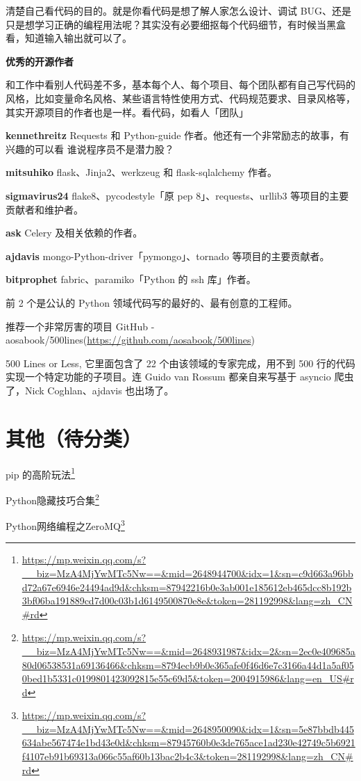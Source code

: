 \documentclass[]{ctexbook}
\renewcommand{\href}[2]{#2\footnote{\url{#1}}}
\begin{document}
清楚自己看代码的目的。就是你看代码是想了解人家怎么设计、调试 BUG、还是只是想学习正确的编程用法呢？其实没有必要细抠每个代码细节，有时候当黑盒看，知道输入输出就可以了。

\textbf{优秀的开源作者}

和工作中看别人代码差不多，基本每个人、每个项目、每个团队都有自己写代码的风格，比如变量命名风格、某些语言特性使用方式、代码规范要求、目录风格等，其实开源项目的作者也是一样。看代码，如看人「团队」

\textbf{kennethreitz} Requests 和 Python-guide 作者。他还有一个非常励志的故事，有兴趣的可以看 谁说程序员不是潜力股？

\textbf{mitsuhiko} flask、Jinja2、werkzeug 和 flask-sqlalchemy 作者。

\textbf{sigmavirus24} flake8、pycodestyle「原 pep 8」、requests、urllib3 等项目的主要贡献者和维护者。

\textbf{ask} Celery 及相关依赖的作者。

\textbf{ajdavis} mongo-Python-driver「pymongo」、tornado 等项目的主要贡献者。

\textbf{bitprophet} fabric、paramiko「Python 的 ssh 库」作者。

前 2 个是公认的 Python 领域代码写的最好的、最有创意的工程师。

推荐一个非常厉害的项目 GitHub - aosabook/500lines(\url{https://github.com/aosabook/500lines})

500 Lines or Less, 它里面包含了 22 个由该领域的专家完成，用不到 500 行的代码实现一个特定功能的子项目。连 Guido van Rossum 都亲自来写基于 asyncio 爬虫了，Nick Coghlan、ajdavis 也出场了。

\hypertarget{ux5176ux4ed6ux5f85ux5206ux7c7b}{%
\section{其他（待分类）}\label{ux5176ux4ed6ux5f85ux5206ux7c7b}}

\href{https://mp.weixin.qq.com/s?__biz=MzA4MjYwMTc5Nw==\&mid=2648944700\&idx=1\&sn=c9d663a96bbd72a67e6946e24494ad9d\&chksm=87942216b0e3ab001e185612eb465dcc8b192b3bf06ba191889cd7d00c03b1d6149500870e8e\&token=281192998\&lang=zh_CN\#rd}{pip 的高阶玩法}

\href{https://mp.weixin.qq.com/s?__biz=MzA4MjYwMTc5Nw==\&mid=2648931987\&idx=2\&sn=2ec0e409685a80d06538531a69136466\&chksm=8794ecb9b0e365afe0f46d6e7c3166a44d1a5af050bed1b5331c0199801423092815e55c69d5\&token=2004915986\&lang=en_US\#rd}{Python隐藏技巧合集}

\href{https://mp.weixin.qq.com/s?__biz=MzA4MjYwMTc5Nw==\&mid=2648950090\&idx=1\&sn=5e87bbdb445634abe567474e1bd43e0d\&chksm=87945760b0e3de765ace1ad230e42749c5b6921f4107eb91b69313a066c55af60b13bac2b4c3\&token=281192998\&lang=zh_CN\#rd}{Python网络编程之ZeroMQ}
\end{document}
